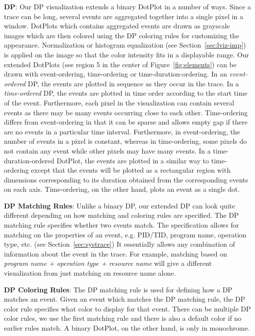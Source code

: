 {\bf DP}:
Our DP visualization extends a binary DotPlot in a number of ways.
Since a trace can be long, several events are aggregated
together into a single pixel in a window.
DotPlots which contains aggregated events are drawn as grayscale images
which are then colored using the DP coloring rules for customizing
the appearance.
Normalization or histogram equalization (see Section~\ref{sec:lviz-imp})
is applied on the image so that the color intensity fits in a displayable range.
Our extended DotPlots (see region 5 in the center of Figure~\ref{fig:elements})
can be drawn with event-ordering, time-ordering or time-duration-ordering.
In an {\em event-ordered} DP, the events are plotted in
sequence as they occur in the trace.
In a {\em time-ordered} DP, the events are plotted in time order
according to the start time of the event.
Furthermore, each pixel in the visualization can contain several events
as there may be many events occurring close to each other.
Time-ordering differs from event-ordering in that it can be sparse
and allows empty gap if there are no events in a particular time interval.
Furthermore, in event-ordering,
the number of events in a pixel is constant, whereas
in time-ordering,
some pixels do not contain any event while other pixels may have many events.
In a time-duration-ordered DotPlot, the events are plotted in a similar way
to time-ordering
except that the events will be plotted as a rectangular region
with dimensions corresponding to its duration obtained from
the corresponding events on each axis.
Time-ordering, on the other hand, plots
an event as a single dot.

{\bf DP Matching Rules}:
Unlike a binary DP, our extended DP can look quite different depending
on how matching and coloring rules are specified.
The DP matching rule specifies whether two events
match. The specification allows for matching on
the properties of an event, e.g. PID/TID, program name,
operation type, etc. (see Section~\ref{sec:systrace})
It essentially allows any combination of information about
the event in the trace.
For example, matching based on {\it program name + operation type + resource name}
will give a different visualization from just matching on resource name alone.

{\bf DP Coloring Rules}:
The DP matching rule is used for defining how a DP matches
an event. Given an event which matches the DP matching rule,
the DP color rule specifies what color to display for that event.
There can be multiple DP color rules, we use the first matching
rule and there is also a default color if no earlier rules match.
A binary DotPlot, on the other hand, is only in monochrome.

